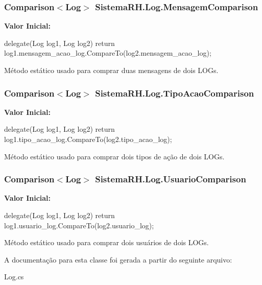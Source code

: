 \hypertarget{class_sistema_r_h_1_1_log_a51daea04f14453613b4a9b0d68f5679e}{
\subsubsection[{MensagemComparison}]{\setlength{\rightskip}{0pt plus 5cm}Comparison$<${\bf Log}$>$ {\bf SistemaRH.Log.MensagemComparison}}}
\label{class_sistema_r_h_1_1_log_a51daea04f14453613b4a9b0d68f5679e}
{\bfseries Valor Inicial:}
\begin{DoxyCode}
 delegate(Log log1, Log log2)
        {
            return log1.mensagem_acao_log.CompareTo(log2.mensagem_acao_log);
        }
\end{DoxyCode}


Método estático usado para comprar duas mensagens de dois LOGs. 

\hypertarget{class_sistema_r_h_1_1_log_a46bedfe624dbeecabcdf8750d71d8503}{
\subsubsection[{TipoAcaoComparison}]{\setlength{\rightskip}{0pt plus 5cm}Comparison$<${\bf Log}$>$ {\bf SistemaRH.Log.TipoAcaoComparison}}}
\label{class_sistema_r_h_1_1_log_a46bedfe624dbeecabcdf8750d71d8503}
{\bfseries Valor Inicial:}
\begin{DoxyCode}
 delegate(Log log1, Log log2)
        {
            return log1.tipo_acao_log.CompareTo(log2.tipo_acao_log);
        }
\end{DoxyCode}


Método estático usado para comprar dois tipos de ação de dois LOGs. 

\hypertarget{class_sistema_r_h_1_1_log_a56bcfc31cd67e8bc471cdb1c39b95625}{
\subsubsection[{UsuarioComparison}]{\setlength{\rightskip}{0pt plus 5cm}Comparison$<${\bf Log}$>$ {\bf SistemaRH.Log.UsuarioComparison}}}
\label{class_sistema_r_h_1_1_log_a56bcfc31cd67e8bc471cdb1c39b95625}
{\bfseries Valor Inicial:}
\begin{DoxyCode}
 delegate(Log log1, Log log2)
        {
            return log1.usuario_log.CompareTo(log2.usuario_log);
        }
\end{DoxyCode}


Método estático usado para comprar dois usuários de dois LOGs. 



A documentação para esta classe foi gerada a partir do seguinte arquivo:\begin{DoxyCompactItemize}
\item 
Log.cs\end{DoxyCompactItemize}
